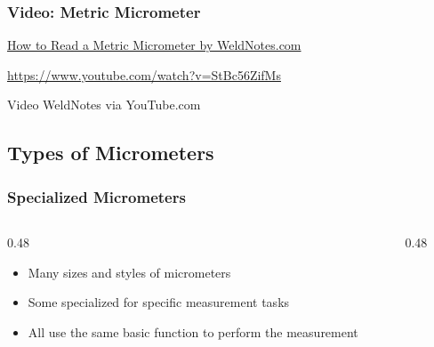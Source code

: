 \begin{frame}
	\frametitle{Video: Metric Micrometer}

    \centering
    \href{https://www.youtube.com/watch?v=StBc56ZifMs}{How to Read a Metric Micrometer by WeldNotes.com}

    \vspace{0.5em}
    {\footnotesize \href{https://www.youtube.com/watch?v=StBc56ZifMs}{https://www.youtube.com/watch?v=StBc56ZifMs}\par}

    \vspace{0.5em}
    {\tiny Video \textcopyright WeldNotes via YouTube.com\par}
\end{frame}

\subsection{Types of Micrometers}

\begin{frame}
	\frametitle{Specialized Micrometers}

    \begin{columns}
        \begin{column}{0.48\linewidth}
            \begin{itemize}[<+- | alert@+>]
                \item Many sizes and styles of micrometers
                \item Some specialized for specific measurement tasks
                \item All use the same basic function to perform the measurement
            \end{itemize}
        \end{column}
        \begin{column}{0.48\linewidth}
        \end{column}
    \end{columns}
\end{frame}

